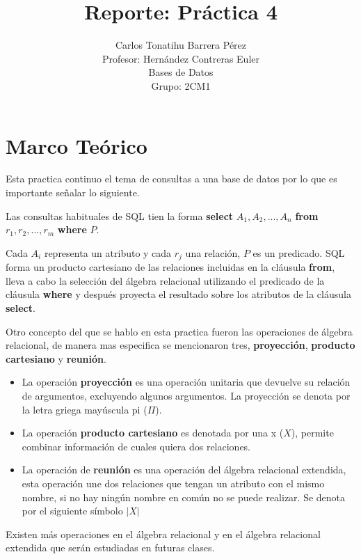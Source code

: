 \documentclass[12pt, titlepage]{article}
\title{Reporte: Práctica 4}
\author{Carlos Tonatihu Barrera Pérez \\ Profesor: Hernández Contreras Euler \\ Bases de Datos \\ Grupo: 2CM1 }
\begin{document}
\maketitle
\tableofcontents
\section{Marco Teórico}
Esta practica continuo el tema de consultas a una base de datos por lo que es importante señalar lo siguiente.

Las consultas habituales de SQL tien la forma \textbf{select} $A_{1}, A_{2},...,A_{n}$ \textbf{from} $r_{1}, r_{2}, ..., r_{m}$ \textbf{where} $P$.\cite{LIBRO}

Cada $A_{i}$ representa un atributo y cada $r_{j}$ una relación, $P$ es un predicado. SQL forma un producto cartesiano de las relaciones incluidas en la cláusula \textbf{from}, lleva a cabo la selección del álgebra relacional utilizando el predicado de la cláusula \textbf{where} y después proyecta el resultado sobre los atributos de la cláusula \textbf{select}.

Otro concepto del que se hablo en esta practica fueron las operaciones de álgebra relacional, de manera mas especifica se mencionaron tres, \textbf{proyección}, \textbf{producto cartesiano} y \textbf{reunión}.\cite{LIBRO}
\begin{itemize}
	\item La operación \textbf{proyección} es una operación unitaria que devuelve su relación de argumentos, excluyendo algunos argumentos. La proyección se denota por la letra griega mayúscula pi ($\Pi$).
	\item La operación \textbf{producto cartesiano} es denotada por una x ($X$), permite combinar información de cuales quiera dos relaciones.
	\item La operación de \textbf{reunión} es una operación del álgebra relacional extendida, esta operación une dos relaciones que tengan un atributo con el mismo nombre, si no hay ningún nombre en común no se puede realizar. Se denota por el siguiente símbolo $|X|$
\end{itemize}
Existen más operaciones en el álgebra relacional y en el álgebra relacional extendida que serán estudiadas en futuras clases.
\newpage
\end{document}
